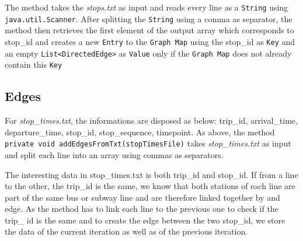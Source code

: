 \documentclass{article}
\begin{document}
The method takes the \textit{stops.txt} as input and reads every line as a \texttt{String} using \texttt{java.util.Scanner}. After splitting the \texttt{String} using a comma as separator, the method then retrieves the first element of the output array which corresponds to stop\_id and creates a new \texttt{Entry} to the \texttt{Graph Map} using the stop\_id as \texttt{Key} and an empty \texttt{List<DirectedEdge>} as \texttt{Value} only if the \texttt{Graph Map} does not already contain this \texttt{Key}

\subsection{Edges}

For \textit{stop\_times.txt}, the informations are disposed as below: trip\_id, arrival\_time, departure\_time, stop\_id, stop\_sequence, timepoint. As above, the method \texttt{private void addEdgesFromTxt(stopTimesFile)} takes \textit{stop\_times.txt} as input and split each line into an array using commas as separators.

The interesting data in {stop\_times.txt} is both trip\_id and stop\_id. If from a line to the other, the trip\_id is the same, we know that both stations of each line are part of the same bus or subway line and are therefore linked together by and edge.
As the method has to link each line to the previous one to check if the trip\_ id is the same and to create the edge between the two stop\_id, we store the data of the current iteration as well as of the previous iteration.

\newpage
\end{document}
